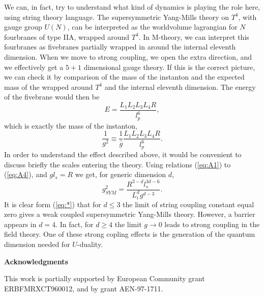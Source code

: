 We can, in fact, try to understand what kind of dynamics is
playing the role here, using string theory language. The
supersymmetric Yang-Mills theory on $T^4$, with gauge group
$U(N)$, can be interpreted as the worldvolume lagrangian for $N$
fourbranes of type IIA, wrapped around $T^4$. In M-theory, we can
interpret this fourbranes as fivebranes partially wrapped in
around the internal eleventh dimension. When we move to strong
coupling, we open the extra direction, and we effectively get a
$5+1$ dimensional gauge theory. If this is the correct picture,
we can check it by comparison of the mass of the instanton and
the expected mass of the wrapped around $T^4$ and the internal
eleventh dimension. The energy of the fivebrane would then be
\begin{equation}
E= \frac {L_1L_2L_3L_4R}{l_p^6},
\label{eq:m26}
\end{equation}
which is exactly the mass of the instanton,
\begin{equation}
\frac {1}{g^2} \equiv \frac {1}{\hat{g}} \frac {L_1L_2L_3L_4
R}{l_p^6}.
\label{eq:m27}
\end{equation}
In order to understand the effect described above, it would be
convenient to discuss briefly the scales entering the theory.
Using relations (\ref{eq:A1}) to (\ref{eq:A4}), and $g l_s =R$ we
get, for generic dimension $d$,
\begin{equation}
g_{SYM}^2 = \frac {R^{3-d} l_s^{3d-6}}{L_i^d g^{d-3}}.
\label{eq:*}
\end{equation}
It is clear form (\ref{eq:*}) that for $d \leq 3$ the limit of
string coupling constant equal zero gives a weak coupled
supersymmetric Yang-Mills theory. However, a barrier appears in
$d=4$. In fact, for $d \geq 4$ the limit $ g \rightarrow 0$ leads
to strong coupling in the field theory. One of these strong
copling effects is the generation of the quantum dimension needed
for $U$-duality.






\vspace{20 mm}
  
\begin{center}
{\bf Acknowledgments}
\end{center}

This work is partially supported by European Community grant 
ERBFMRXCT960012, and by grant AEN-97-1711.











